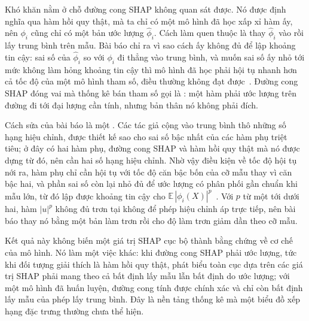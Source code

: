 Khó khăn nằm ở chỗ đường cong SHAP không quan sát được. Nó được định nghĩa qua
hàm hồi quy thật, mà ta chỉ có một mô hình đã học xấp xỉ hàm ấy, nên $\phi_i$
cũng chỉ có một bản ước lượng $\hat\phi_i$. Cách làm quen thuộc là thay
$\hat\phi_i$ vào rồi lấy trung bình trên mẫu. Bài báo chỉ ra vì sao cách ấy
không đủ để lập khoảng tin cậy: sai số của $\hat\phi_i$ so với $\phi_i$ đi
thẳng vào trung bình, và muốn sai số ấy nhỏ tới mức không làm hỏng khoảng tin
cậy thì mô hình đã học phải hội tụ nhanh hơn cả tốc độ của một mô hình tham số,
điều thường không đạt được~\autocite{p19shapinference}. Đường cong SHAP đóng vai
mà thống kê bán tham số gọi là : một hàm phải
ước lượng trên đường đi tới đại lượng cần tính, nhưng bản thân nó không phải
đích.

Cách sửa của bài báo là một . Các
tác giả cộng vào trung bình thô những số hạng hiệu chỉnh, được thiết kế sao cho
sai số bậc nhất của các hàm phụ triệt tiêu; ở đây có hai hàm phụ, đường cong SHAP
và hàm hồi quy thật mà nó được dựng từ đó, nên cần hai số hạng hiệu chỉnh. Nhờ
vậy điều kiện về tốc độ hội tụ nới ra, hàm phụ chỉ cần hội tụ với tốc độ căn
bậc bốn của cỡ mẫu thay vì căn bậc hai, và phần sai số còn lại nhỏ đủ để ước
lượng có phân phối gần chuẩn khi mẫu lớn, từ đó lập được khoảng tin cậy cho
$\mathbb{E}\,|\phi_i(X)|^p$~\autocite{p19shapinference}. Với $p$ từ một tới
dưới hai, hàm $|u|^p$ không đủ trơn tại không để phép hiệu chỉnh áp trực tiếp,
nên bài báo thay nó bằng một bản làm trơn rồi cho độ làm trơn giảm dần theo cỡ
mẫu.

%
Kết quả này không biến một giá trị SHAP cục bộ thành bằng chứng về cơ chế của
mô hình. Nó làm một việc khác: khi đường cong SHAP phải ước lượng, tức khi đối
tượng giải thích là hàm hồi quy thật, phát biểu toàn cục dựa trên các giá trị
SHAP phải mang theo cả bất định lấy mẫu lẫn bất định do ước lượng; với một mô
hình đã huấn luyện, đường cong tính được chính xác và chỉ còn bất định lấy mẫu
của phép lấy trung bình. Đây là nền tảng thống kê mà một biểu đồ xếp hạng
đặc trưng thường chưa thể hiện.
